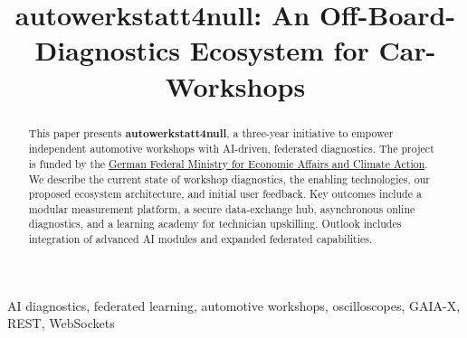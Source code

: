 




\title{autowerkstatt4null: An Off-Board-Diagnostics Ecosystem for Car-Workshops}
\author{%
}

\maketitle

\pagestyle{fancy}
\renewcommand{\headrulewidth}{0pt}
\renewcommand{\footrulewidth}{0.4pt}
\fancyhf{}

\fancyfoot[R]{\thepage}

\begin{abstract}
This paper presents \textbf{autowerkstatt4null}, a three-year initiative to empower independent automotive workshops with AI-driven, federated diagnostics. 
The project is funded by the \href{https://www.bundeswirtschaftsministerium.de/Navigation/EN/Home/home.html}{German Federal Ministry for Economic Affairs and Climate Action}. 
We describe the current state of workshop diagnostics, the enabling technologies, our proposed ecosystem architecture, and initial user feedback. 
Key outcomes include a modular measurement platform, a secure data-exchange hub, asynchronous online diagnostics, and a learning academy for technician upskilling. 
Outlook includes integration of advanced AI modules and expanded federated capabilities.
\end{abstract}

\begin{IEEEkeywords}
AI diagnostics, federated learning, automotive workshops, oscilloscopes, GAIA-X, REST, WebSockets
\end{IEEEkeywords}

